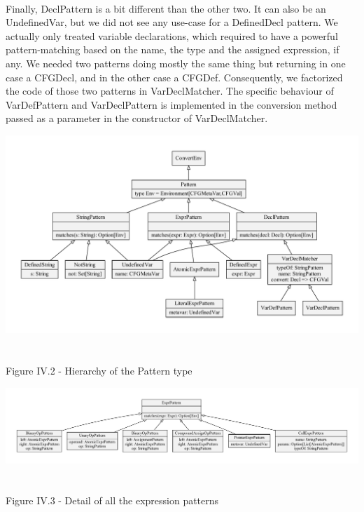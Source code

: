 \documentclass{report}
\begin{document}
\paragraph{}
\hspace{4mm}Finally, DeclPattern is a bit different than the other two. It can also be an UndefinedVar, but we did not see any use-case for a DefinedDecl pattern. 
We actually only treated variable declarations, which required to have a powerful pattern-matching based on the name, the type and the assigned expression, if any.
We needed two patterns doing mostly the same thing but returning in one case a CFGDecl, and in the other case a CFGDef. Consequently, we factorized the code of those two patterns
in VarDeclMatcher. The specific behaviour of VarDefPattern and VarDeclPattern is implemented in the conversion method passed as a parameter in the constructor of VarDeclMatcher.

\begin{center}
\includegraphics[scale=0.55]{data/patterns}
~\\~\\Figure IV.2 - Hierarchy of the Pattern type
\end{center}

\begin{center}
\includegraphics[scale=0.45]{data/expr_pattern}
~\\~\\Figure IV.3 - Detail of all the expression patterns
\end{center}
\end{document}
